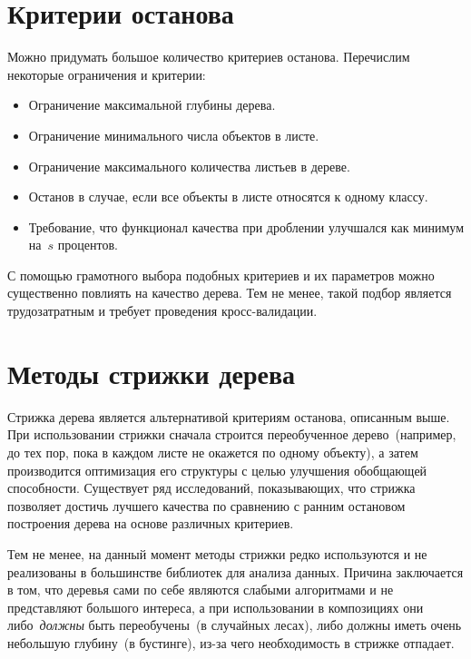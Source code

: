 \documentclass[12pt,fleqn]{article}
\begin{document}


\section{Критерии останова}
Можно придумать большое количество критериев останова.
Перечислим некоторые ограничения и критерии:
\begin{itemize}
    \item Ограничение максимальной глубины дерева.
    \item Ограничение минимального числа объектов в листе.
    \item Ограничение максимального количества листьев в дереве.
    \item Останов в случае, если все объекты в листе относятся к одному классу.
    \item Требование, что функционал качества при дроблении улучшался как минимум на~$s$ процентов.
\end{itemize}

С помощью грамотного выбора подобных критериев и их параметров можно существенно повлиять
на качество дерева.
Тем не менее, такой подбор является трудозатратным и требует проведения кросс-валидации.

\section{Методы стрижки дерева}
Стрижка дерева является альтернативой критериям останова, описанным выше.
При использовании стрижки сначала строится переобученное дерево~(например, до тех пор, пока
в каждом листе не окажется по одному объекту), а затем производится оптимизация его структуры
с целью улучшения обобщающей способности.
Существует ряд исследований, показывающих, что стрижка позволяет достичь лучшего качества
по сравнению с ранним остановом построения дерева на основе различных критериев.

Тем не менее, на данный момент методы стрижки редко используются
и не реализованы в большинстве библиотек для анализа данных.
Причина заключается в том, что деревья сами по себе являются слабыми алгоритмами и не представляют большого интереса,
а при использовании в композициях они либо~\emph{должны} быть переобучены~(в случайных лесах),
либо должны иметь очень небольшую глубину~(в бустинге), из-за чего необходимость в стрижке отпадает.
\end{document}
